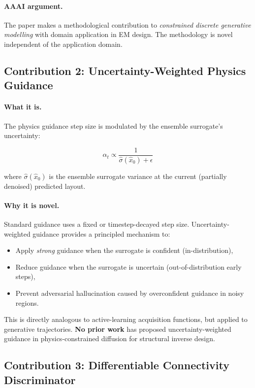 \documentclass[12pt,a4paper]{article}
\newcommand{\xhat}{\hat{x}}
\newcommand{\sigmahat}{\hat{\sigma}}
\theoremstyle{definition}
\theoremstyle{plain}
\theoremstyle{remark}
\begin{document}
\paragraph{AAAI argument.}
The paper makes a methodological contribution to \emph{constrained discrete generative
modelling} with domain application in EM design.
The methodology is novel independent of the application domain.

\subsection{Contribution 2: Uncertainty-Weighted Physics Guidance}

\paragraph{What it is.}
The physics guidance step size is modulated by the ensemble surrogate's uncertainty:

\begin{equation}
  \alpha_t \propto \frac{1}{\sigmahat(\xhat_0) + \epsilon}
  \label{eq:uncertainty_guidance}
\end{equation}

where $\sigmahat(\xhat_0)$ is the ensemble surrogate variance at the current
(partially denoised) predicted layout.

\paragraph{Why it is novel.}
Standard guidance uses a fixed or timestep-decayed step size.
Uncertainty-weighted guidance provides a principled mechanism to:
\begin{itemize}
  \item Apply \emph{strong} guidance when the surrogate is confident (in-distribution),
  \item Reduce guidance when the surrogate is uncertain (out-of-distribution early steps),
  \item Prevent adversarial hallucination caused by overconfident guidance in noisy regions.
\end{itemize}

This is directly analogous to active-learning acquisition functions, but applied to
generative trajectories.
\textbf{No prior work} has proposed uncertainty-weighted guidance in physics-constrained
diffusion for structural inverse design.

\subsection{Contribution 3: Differentiable Connectivity Discriminator}
\end{document}
